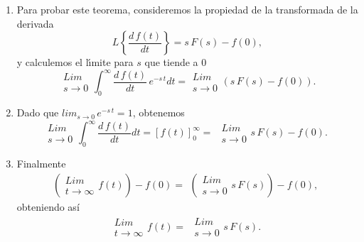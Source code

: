 \begin{enumerate}
\item Para probar este teorema, consideremos la propiedad de la transformada de la derivada
\begin{equation}
L \left\{ \frac{d \, f(t)}{dt}\right\} = s \, F(s) - f(0),
\end{equation}
y calculemos el l\'{\i}mite para $s$ que tiende a $0$
\begin{equation}
\begin{array}{c}
Lim \\
s \rightarrow 0
\end{array}
\int_{0}^{\infty} \frac{d \, f(t)}{dt} \, e^{-s \, t} dt = 
\begin{array}{c}
Lim \\
s \rightarrow 0
\end{array}
\left(s \, F(s) - f(0)\right).
\end{equation}

\item Dado que $lim_{s \rightarrow 0} \, e^{-s \, t} = 1$, obtenemos
\begin{equation}
\begin{array}{c} 
Lim \\
s \rightarrow 0
\end{array}
\int_{0}^{\infty} \frac{d \, f(t)}{dt} dt = \left[ f(t) \right]_{0}^{\infty} =
\begin{array}{c}
\begin{array}{c}
	Lim \\
	s \rightarrow 0
\end{array}
s \, F(s) - f(0).
\end{array}
\end{equation}

\item Finalmente
\begin{equation}
\left(\begin{array}{c} 
Lim \\
t \rightarrow \infty
\end{array}
f(t)
\right) - f(0) = 
\begin{array}{c}
\left(\begin{array}{c}
	Lim \\
	s \rightarrow 0
\end{array}
s \, F(s)
\right) - f(0),
\end{array}
\end{equation}
obteniendo así
\begin{equation}
	\begin{array}{c} 
		Lim \\
		t \rightarrow \infty
	\end{array}
	f(t) = 
	\begin{array}{c}
		\begin{array}{c}
			Lim \\
			s \rightarrow 0
		\end{array}
		s \, F(s).
	\end{array}
\end{equation}



\end{enumerate}


